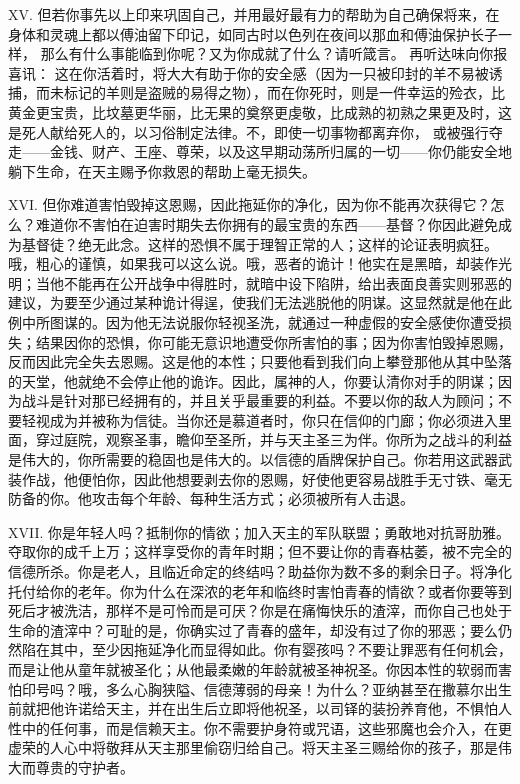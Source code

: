 XV. 但若你事先以上印来巩固自己，并用最好最有力的帮助为自己确保将来，在身体和灵魂上都以傅油留下印记，如同古时以色列在夜间以那血和傅油保护长子一样， 那么有什么事能临到你呢？又为你成就了什么？请听箴言。  再听达味向你报喜讯： 这在你活着时，将大大有助于你的安全感（因为一只被印封的羊不易被诱捕，而未标记的羊则是盗贼的易得之物），而在你死时，则是一件幸运的殓衣，比黄金更宝贵，比坟墓更华丽，比无果的奠祭更虔敬，比成熟的初熟之果更及时，这是死人献给死人的，以习俗制定法律。不，即使一切事物都离弃你， 或被强行夺走——金钱、财产、王座、尊荣，以及这早期动荡所归属的一切——你仍能安全地躺下生命，在天主赐予你救恩的帮助上毫无损失。\par

XVI. 但你难道害怕毁掉这恩赐，因此拖延你的净化，因为你不能再次获得它？怎么？难道你不害怕在迫害时期失去你拥有的最宝贵的东西——基督？你因此避免成为基督徒？绝无此念。这样的恐惧不属于理智正常的人；这样的论证表明疯狂。哦，粗心的谨慎，如果我可以这么说。哦，恶者的诡计！他实在是黑暗，却装作光明；当他不能再在公开战争中得胜时，就暗中设下陷阱，给出表面良善实则邪恶的建议，为要至少通过某种诡计得逞，使我们无法逃脱他的阴谋。这显然就是他在此例中所图谋的。因为他无法说服你轻视圣洗，就通过一种虚假的安全感使你遭受损失；结果因你的恐惧，你可能无意识地遭受你所害怕的事；因为你害怕毁掉恩赐，反而因此完全失去恩赐。这是他的本性；只要他看到我们向上攀登那他从其中坠落的天堂，他就绝不会停止他的诡诈。因此，属神的人，你要认清你对手的阴谋；因为战斗是针对那已经拥有的，并且关乎最重要的利益。不要以你的敌人为顾问；不要轻视成为并被称为信徒。当你还是慕道者时，你只在信仰的门廊；你必须进入里面，穿过庭院，观察圣事，瞻仰至圣所，并与天主圣三为伴。你所为之战斗的利益是伟大的，你所需要的稳固也是伟大的。以信德的盾牌保护自己。你若用这武器武装作战，他便怕你，因此他想要剥去你的恩赐，好使他更容易战胜手无寸铁、毫无防备的你。他攻击每个年龄、每种生活方式；必须被所有人击退。\par

XVII. 你是年轻人吗？抵制你的情欲；加入天主的军队联盟；勇敢地对抗哥肋雅。 夺取你的成千上万；这样享受你的青年时期；但不要让你的青春枯萎，被不完全的信德所杀。你是老人，且临近命定的终结吗？助益你为数不多的剩余日子。将净化托付给你的老年。你为什么在深浓的老年和临终时害怕青春的情欲？或者你要等到死后才被洗洁，那样不是可怜而是可厌？你是在痛悔快乐的渣滓，而你自己也处于生命的渣滓中？可耻的是，你确实过了青春的盛年，却没有过了你的邪恶；要么仍然陷在其中，至少因拖延净化而显得如此。你有婴孩吗？不要让罪恶有任何机会，而是让他从童年就被圣化；从他最柔嫩的年龄就被圣神祝圣。你因本性的软弱而害怕印号吗？哦，多么心胸狭隘、信德薄弱的母亲！为什么？亚纳甚至在撒慕尔出生前就把他许诺给天主，并在出生后立即将他祝圣，以司铎的装扮养育他，不惧怕人性中的任何事，而是信赖天主。你不需要护身符或咒语，这些邪魔也会介入，在更虚荣的人心中将敬拜从天主那里偷窃归给自己。将天主圣三赐给你的孩子，那是伟大而尊贵的守护者。\par

